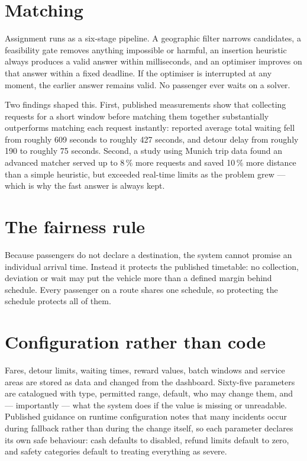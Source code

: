 \section{Matching}

Assignment runs as a six-stage pipeline. A geographic filter narrows candidates, a feasibility gate
removes anything impossible or harmful, an insertion heuristic always produces a valid answer within
milliseconds, and an optimiser improves on that answer within a fixed deadline. If the optimiser is
interrupted at any moment, the earlier answer remains valid. No passenger ever waits on a solver.

Two findings shaped this. First, published measurements show that collecting requests for a short
window before matching them together substantially outperforms matching each request instantly:
reported average total waiting fell from roughly 609 seconds to roughly 427 seconds, and detour
delay from roughly 190 to roughly 75 seconds. Second, a study using Munich trip data found an
advanced matcher served up to 8\,\% more requests and saved 10\,\% more distance than a simple
heuristic, but exceeded real-time limits as the problem grew --- which is why the fast answer is
always kept.

\section{The fairness rule}

Because passengers do not declare a destination, the system cannot promise an individual arrival
time. Instead it protects the published timetable: no collection, deviation or wait may put the
vehicle more than a defined margin behind schedule. Every passenger on a route shares one schedule,
so protecting the schedule protects all of them.

\section{Configuration rather than code}

Fares, detour limits, waiting times, reward values, batch windows and service areas are stored as
data and changed from the dashboard. Sixty-five parameters are catalogued with type, permitted
range, default, who may change them, and --- importantly --- what the system does if the value is
missing or unreadable. Published guidance on runtime configuration notes that many incidents occur
during fallback rather than during the change itself, so each parameter declares its own safe
behaviour: cash defaults to disabled, refund limits default to zero, and safety categories default
to treating everything as severe.

